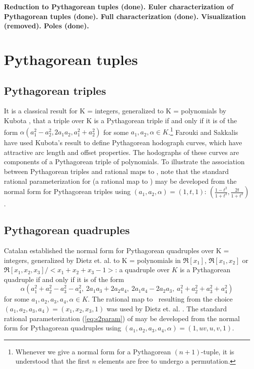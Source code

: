 \documentclass[11pt]{article}
\begin{document}
{\bf 
Reduction to Pythagorean tuples (done).
Euler characterization of Pythagorean tuples (done).
Full characterization (done).
Visualization (removed).
Poles (done).
}

\section{Pythagorean tuples}

\subsection{Pythagorean triples}

It is a classical result for K = integers, 
generalized to K = polynomials by Kubota \cite{kubota72},
that a triple over K is a Pythagorean triple if and only if
it is of the form 
$\alpha(a_1^2 - a_2^2, 2a_1a_2, a_1^2 + a_2^2)$
for some $a_1,a_2,\alpha \in K$.\footnote{Whenever
	we give a normal form for a Pythagorean $(n+1)$-tuple,
	it is understood that the first $n$ elements are free to undergo
	a permutation.}
Farouki and Sakkalis \cite{farouki90} have used
Kubota's result to define Pythagorean hodograph curves, 
which have attractive arc length and offset properties.
The hodographs of these curves are components of a Pythagorean triple
of polynomials.
To illustrate the association between Pythagorean triples and rational maps to ,
note that the standard rational parameterization for  (a rational map to )
may be developed from the normal form for Pythagorean triples 
using $(a_1,a_2,\alpha) = (1,t,1)$:
$(\frac{1-t^2}{1+t^2}, \frac{2t}{1+t^2})$.

\subsection{Pythagorean quadruples}

Catalan \cite{catalan85} established the normal form for Pythagorean quadruples over
K = integers, generalized by Dietz et. al. \cite{dietz93} to K = polynomials in 
$\Re[x_1]$, $\Re[x_1,x_2]$ or $\Re[x_1,x_2,x_3]/<x_1+x_2+x_3-1>$:
a quadruple over $K$ is a Pythagorean quadruple if and only if it is of the form
\begin{equation}
\label{eq:quad}
\alpha (a_1^2+a_2^2-a_3^2-a_4^2,\ 2a_1a_3+2a_2a_4,\ 2a_1a_4-2a_2a_3,
\ a_1^2+a_2^2+a_3^2+a_4^2)
\end{equation}
for some $a_1,a_2,a_3,a_4,\alpha \in K$.
The rational map to \ 
resulting from the choice $(a_1,a_2,a_3,a_4) = (x_1,x_2,x_3,1)$ 
was used by Dietz et. al. \cite{dietz93}.
The standard rational parameterization (\ref{eq:s2param}) of 
may be developed from the normal form
for Pythagorean quadruples using $(a_1,a_2,a_3,a_4,\alpha) = (1,uv,u,v,1)$.
\end{document}

